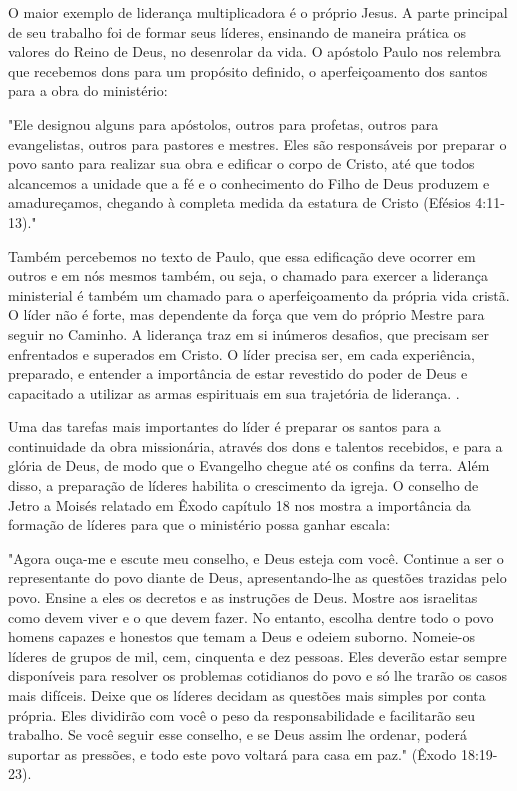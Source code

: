 \documentclass[12pt,openright,oneside,a4paper]{abntex2}
\begin{document}
O maior exemplo de liderança multiplicadora é o próprio Jesus. A parte principal de seu trabalho foi de formar seus líderes, ensinando de maneira prática os valores do Reino de Deus, no desenrolar da vida. O apóstolo Paulo nos relembra que recebemos dons para um propósito definido, o aperfeiçoamento dos santos para a obra do ministério: 

\begin{citacao}"Ele designou alguns para apóstolos, outros para profetas, outros para evangelistas, outros para pastores e mestres. Eles são responsáveis por preparar o povo santo para realizar sua obra e edificar o corpo de Cristo, até que todos alcancemos a unidade que a fé e o conhecimento do Filho de Deus produzem e amadureçamos, chegando à completa medida da estatura de Cristo (Efésios 4:11-13)."\end{citacao}

Também percebemos no texto de Paulo, que essa edificação deve ocorrer em outros e em nós mesmos também, ou seja, o chamado para exercer a liderança ministerial é também um chamado para o aperfeiçoamento da própria vida cristã. O líder não é forte, mas dependente da força que vem do próprio Mestre para seguir no Caminho\cite[p. 130,131]{brandao}. A liderança traz em si inúmeros desafios, que precisam ser enfrentados e superados em Cristo. O líder precisa ser, em cada experiência, preparado, e entender a importância de estar revestido do poder de Deus e capacitado a utilizar as armas espirituais em sua trajetória de liderança. \cite[p. 132]{brandao}.

Uma das tarefas mais importantes do líder é preparar os santos para a continuidade da obra missionária, através dos dons e talentos recebidos, e para a glória de Deus, de modo que o Evangelho chegue até os confins da terra. Além disso, a preparação de líderes habilita o crescimento da igreja. O conselho de Jetro a Moisés relatado em Êxodo capítulo 18 nos mostra a importância da formação de líderes para que o ministério possa ganhar escala: 

\begin{citacao}"Agora ouça-me e escute meu conselho, e Deus esteja com você. Continue a ser o representante do povo diante de Deus, apresentando-lhe as questões trazidas pelo povo. Ensine a eles os decretos e as instruções de Deus. Mostre aos israelitas como devem viver e o que devem fazer. No entanto, escolha dentre todo o povo homens capazes e honestos que temam a Deus e odeiem suborno. Nomeie-os líderes de grupos de mil, cem, cinquenta e dez pessoas. Eles deverão estar sempre disponíveis para resolver os problemas cotidianos do povo e só lhe trarão os casos mais difíceis. Deixe que os líderes decidam as questões mais simples por conta própria. Eles dividirão com você o peso da responsabilidade e facilitarão seu trabalho. Se você seguir esse conselho, e se Deus assim lhe ordenar, poderá suportar as pressões, e todo este povo voltará para casa em paz." (Êxodo 18:19-23).\end{citacao}
\end{document}
